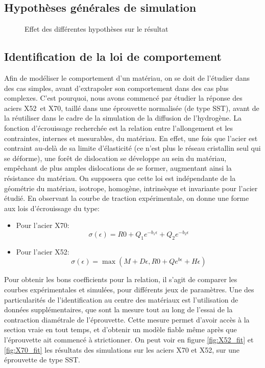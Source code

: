 \documentclass[a4paper, french, 11pt, draft]{article}
\begin{document}
    \subsection{Hypothèses générales de simulation}

    \begin{figure}[hbt]
        \centering
        \caption{Effet des différentes hypothèses sur le résultat}
        \label{anim:effet_3D}
    \end{figure}

    \subsection{Identification de la loi de comportement}
    Afin de modéliser le comportement d'un matériau, on se doit de l'étudier dans des cas simples, avant d'extrapoler son comportement dans des cas plus complexes.
    C'est pourquoi, nous avons commencé par étudier la réponse des aciers X52 et X70, taillé dans une éprouvette normalisée (de type SST), avant de la réutiliser dans le cadre de la simulation de la diffusion de l'hydrogène.
    La fonction d'écrouissage recherchée est la relation entre l'allongement et les contraintes, internes et mesurables, du matériau.
    En effet, une fois que l'acier est contraint au-delà de sa limite d'élasticité (ce n'est plus le réseau cristallin seul qui se déforme), une \og forêt \fg de dislocation se développe au sein du matériau, empêchant de plus amples dislocations de se former, augmentant ainsi la résistance du matériau.
    On supposera que cette loi est indépendante de la géométrie du matériau, isotrope, homogène, intrinsèque et invariante pour l'acier étudié.
    En observant la courbe de traction expérimentale, on donne une forme aux lois d'écrouissage du type:
    \begin{itemize}
        \item Pour l'acier X70:
        \[
            \sigma(\epsilon) = R0 + Q_1e^{-b_1\epsilon} + Q_2e^{-b_2\epsilon}
        \]
        \item Pour l'acier X52:
        \[
            \sigma(\epsilon) = \max(M + D\epsilon, R0 + Qe^{b\epsilon} + H\epsilon)
        \]  
    \end{itemize}
    Pour obtenir les bons coefficients pour la relation, il s'agit de comparer les courbes expérimentales et simulées, pour différents jeux de paramètres. 
    Une des particularités de l'identification au centre des matériaux est l'utilisation de données supplémentaires, que sont la mesure tout au long de l'essai de la contraction diamétrale de l'éprouvette.
    Cette mesure permet d'avoir accès à la section vraie en tout temps, et d'obtenir un modèle fiable même après que l'éprouvette ait commencé à strictionner.
    On peut voir en figure \ref{fig:X52_fit} et \ref{fig:X70_fit} les résultats des simulations sur les aciers X70 et X52, sur une éprouvette de type SST.
\end{document}
